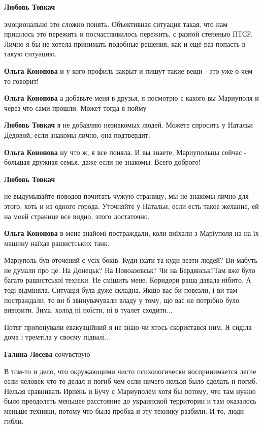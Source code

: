 \begin{itemize}
\textbf{Любовь Товкач} 

эмоционально это сложно понять. Объективная ситуация такая, что нам пришлось
это пережить и посчастливилось пережить, с разной степенью ПТСР. Лично я бы не
хотела принимать подобные решения, как и ещё раз попасть в такую ситуацию.

\textbf{Ольга Кононова} и у кого профиль закрыт и пишут такие вещи - это уже о чём то говорит!

\textbf{Ольга Кононова} а добавьте меня в друзья, я посмотрю с какого вы Мариуполя и через что сами прошли. Может тогда я пойму

\textbf{Любовь Товкач} я не добавляю незнакомых людей. Можете спросить у Натальи Дедовой, если знакомы лично, она подтвердит.

\textbf{Ольга Кононова} ну что ж, я все поняла. И вы знаете, Мариупольцы сейчас - большая дружная семья, даже если не знакомы. Всего доброго!

\textbf{Любовь Товкач} 

не выдумывайте поводов почитать чужую страницу, мы не знакомы лично для этого,
хоть и из одного города. Уточняйте у Натальи, если есть такое желание, ей на
моей странице все видно, этого достаточно.

\textbf{Ольга Кононова} в мене знайомі постраждали, коли виїхали з Маріуполя на на їх машину наїхав рашистських танк.


Маріуполь був оточений с усіх боків. Куди їхати та куди везти людей? Ви мабуть
не думали про це. На Донецьк? На Новоазовськ? Чи на Бердянськ?Там вже було
багато рашистської техніки. Не смішить мене. Коридори раша давала нібито. А
тоді відміняла. Ситуація була дуже складна. Якщо вас би повезли, і ви там
постраждали, то ви б звинувачували владу у тому, що вас не потрібно було
вивозити. Зима, холод ні поїсти, ні в туалет сходити...

Потяг пропонували евакуаційний я не знаю чи хтось скористався ним. Я сиділа
дома і тремтіла у своєму підвалі...

\textbf{Галина Лосева} сочувствую 🙁

В том-то и дело, что окружающими чисто психологически воспринимается легче если
человек что-то делал и погиб чем если ничего нельзя было сделать и погиб.
Нельзя сравнивать Ирпень и Бучу с Мариуполем хотя бы потому, что там нужно было
преодолеть меньшее расстояние до украинской территории и там оказалось меньше
техники, потому что была пробка и эту технику разбили. И то, люди гибли.


\end{itemize}
